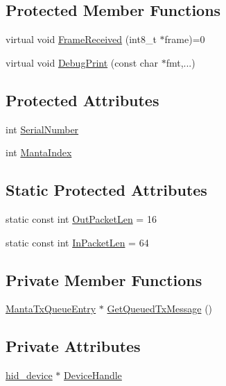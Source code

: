 \subsection*{\-Protected \-Member \-Functions}
\begin{DoxyCompactItemize}
\item 
virtual void \hyperlink{classMantaUSB_abcf3545bb86f2175148bd06574b81632}{\-Frame\-Received} (int8\-\_\-t $\ast$frame)=0
\item 
virtual void \hyperlink{classMantaUSB_a0b77693f738aa98742dc259e09feb5dd}{\-Debug\-Print} (const char $\ast$fmt,...)
\end{DoxyCompactItemize}
\subsection*{\-Protected \-Attributes}
\begin{DoxyCompactItemize}
\item 
int \hyperlink{classMantaUSB_a665d9f2432ded4c447e53dba384cbb69}{\-Serial\-Number}
\item 
int \hyperlink{classMantaUSB_a689a16560bfa8ecd1681e2f0397f68f2}{\-Manta\-Index}
\end{DoxyCompactItemize}
\subsection*{\-Static \-Protected \-Attributes}
\begin{DoxyCompactItemize}
\item 
static const int \hyperlink{classMantaUSB_a32fd2c8f871a3639bf913f599c2f3b04}{\-Out\-Packet\-Len} = 16
\item 
static const int \hyperlink{classMantaUSB_a13d2528c9c12d91dd34a8f99b3fed0b3}{\-In\-Packet\-Len} = 64
\end{DoxyCompactItemize}
\subsection*{\-Private \-Member \-Functions}
\begin{DoxyCompactItemize}
\item 
\hyperlink{structMantaUSB_1_1MantaTxQueueEntry}{\-Manta\-Tx\-Queue\-Entry} $\ast$ \hyperlink{classMantaUSB_a2413f83812c4dd4b08af054e2e5506d3}{\-Get\-Queued\-Tx\-Message} ()
\end{DoxyCompactItemize}
\subsection*{\-Private \-Attributes}
\begin{DoxyCompactItemize}
\item 
\hyperlink{MantaUSB_8h_aa6da74d5686d198dd3e5440e60088fcc}{hid\-\_\-device} $\ast$ \hyperlink{classMantaUSB_ab1b01bd783ce58a4cfceadaf593759e8}{\-Device\-Handle}
\end{DoxyCompactItemize}

